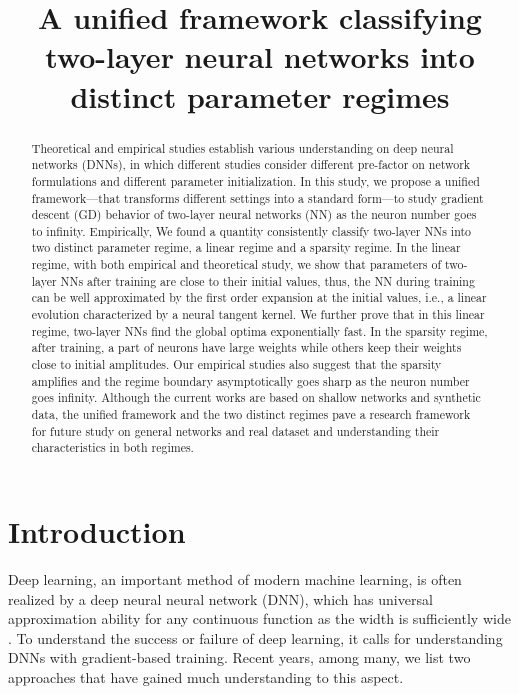 \documentclass{article}
\begin{document}
\title{A unified framework classifying two-layer neural networks into distinct parameter regimes}
\author{}

\maketitle
\begin{abstract}
    Theoretical and empirical studies establish various understanding on deep neural networks (DNNs), in which different studies consider different pre-factor on network formulations and different parameter initialization. In this study, we propose a unified framework---that transforms different settings into a standard form---to study gradient descent (GD) behavior of two-layer neural networks (NN) as the neuron number goes to infinity. Empirically, We found a quantity consistently classify two-layer NNs into two distinct parameter regime, a linear regime and a sparsity regime. In the linear regime, with both empirical and theoretical study, we show that  parameters of two-layer NNs after training are close to their initial values, thus, the NN during training can be well approximated by the first order expansion at the initial values, i.e., a linear evolution characterized by a neural tangent kernel. We further prove that in this linear regime, two-layer NNs find the global optima exponentially fast.  In the sparsity regime, after training, a part of neurons have large weights while others keep their weights close to initial amplitudes. Our empirical studies also suggest that the sparsity amplifies and the regime boundary asymptotically goes sharp as the neuron number goes infinity. Although the current works are based on shallow networks and synthetic data, the unified framework and the two distinct regimes pave a research framework for future study on general networks and real dataset and understanding their characteristics in both regimes.
\end{abstract}

\section{Introduction}
Deep learning, an important method of modern machine learning, is often realized by a deep neural neural network (DNN), which has universal approximation ability for any continuous function as the width is sufficiently wide \cite{cybenko1989approximation}. To understand the success \cite{lecun_deep_2015} or failure \cite{nye2018efficient} of deep learning, it calls for understanding DNNs with gradient-based training. Recent years, among many, we list two approaches that have gained much understanding to this aspect.
\end{document}
